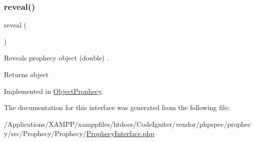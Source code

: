 \subsubsection{\texorpdfstring{reveal()}{reveal()}}
{\footnotesize\ttfamily reveal (\begin{DoxyParamCaption}{ }\end{DoxyParamCaption})}

Reveals prophecy object (double) .

\begin{DoxyReturn}{Returns}
object 
\end{DoxyReturn}


Implemented in \mbox{\hyperlink{class_prophecy_1_1_prophecy_1_1_object_prophecy_a95807c4aeec3dd185c70249cea8a0ea8}{Object\+Prophecy}}.



The documentation for this interface was generated from the following file\+:\begin{DoxyCompactItemize}
\item 
/\+Applications/\+X\+A\+M\+P\+P/xamppfiles/htdocs/\+Code\+Igniter/vendor/phpspec/prophecy/src/\+Prophecy/\+Prophecy/\mbox{\hyperlink{_prophecy_interface_8php}{Prophecy\+Interface.\+php}}\end{DoxyCompactItemize}
